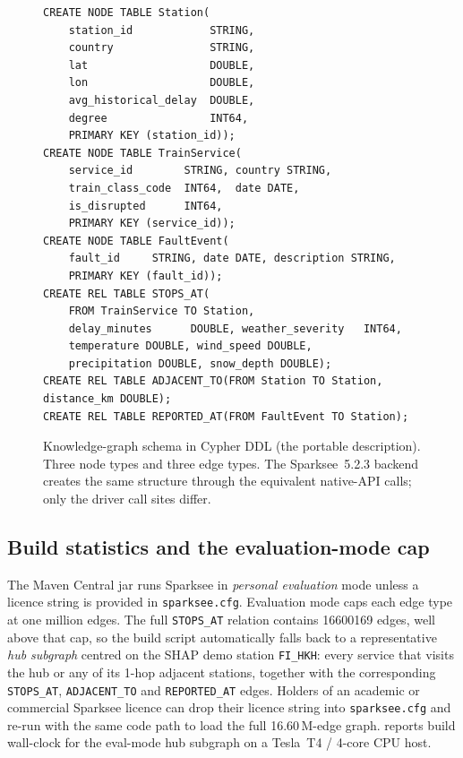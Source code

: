 \begin{figure}[H]
\begin{lstlisting}[language=Cypher]
CREATE NODE TABLE Station(
    station_id            STRING,
    country               STRING,
    lat                   DOUBLE,
    lon                   DOUBLE,
    avg_historical_delay  DOUBLE,
    degree                INT64,
    PRIMARY KEY (station_id));
CREATE NODE TABLE TrainService(
    service_id        STRING, country STRING,
    train_class_code  INT64,  date DATE,
    is_disrupted      INT64,
    PRIMARY KEY (service_id));
CREATE NODE TABLE FaultEvent(
    fault_id     STRING, date DATE, description STRING,
    PRIMARY KEY (fault_id));
CREATE REL TABLE STOPS_AT(
    FROM TrainService TO Station,
    delay_minutes      DOUBLE, weather_severity   INT64,
    temperature DOUBLE, wind_speed DOUBLE,
    precipitation DOUBLE, snow_depth DOUBLE);
CREATE REL TABLE ADJACENT_TO(FROM Station TO Station, distance_km DOUBLE);
CREATE REL TABLE REPORTED_AT(FROM FaultEvent TO Station);
\end{lstlisting}
\caption{Knowledge-graph schema in Cypher DDL (the portable description). Three node types and three edge types. The Sparksee~5.2.3 backend creates the same structure through the equivalent native-API calls; only the driver call sites differ.}
\label{lst:kg-schema}
\end{figure}

\subsection{Build statistics and the evaluation-mode cap}

The Maven Central jar runs Sparksee in \emph{personal evaluation} mode unless a licence string is provided in \texttt{sparksee.cfg}. Evaluation mode caps each edge type at one million edges. The full \texttt{STOPS\_AT} relation contains \num{16600169} edges, well above that cap, so the build script automatically falls back to a representative \emph{hub subgraph} centred on the SHAP demo station \texttt{FI\_HKH}: every service that visits the hub or any of its 1-hop adjacent stations, together with the corresponding \texttt{STOPS\_AT}, \texttt{ADJACENT\_TO} and \texttt{REPORTED\_AT} edges. Holders of an academic or commercial Sparksee licence can drop their licence string into \texttt{sparksee.cfg} and re-run with the same code path to load the full \num{16.60}\,M-edge graph.  reports build wall-clock for the eval-mode hub subgraph on a Tesla~T4 / 4-core CPU host.

